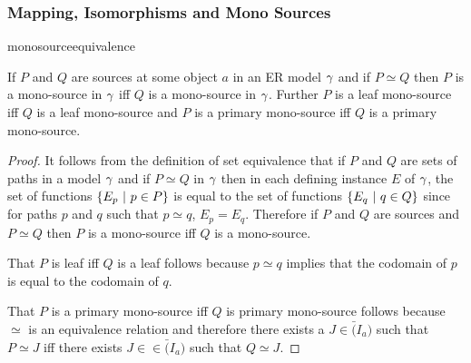 
\subsubsection{Mapping, Isomorphisms and Mono Sources}

monosourceequivalence
\begin{lemma}
\label{monosourceequivalence}
If  $P$ and $Q$ are sources at some object $a$ in an ER model $\gamma$ and if $P \simeq Q$  then   $P$ is a mono-source in $\gamma$ iff $Q$ is a mono-source in $\gamma$.  Further $P$ is a leaf mono-source iff $Q$ is a leaf mono-source and $P$ is a primary mono-source iff $Q$ is a primary mono-source.
\end{lemma}
\begin{proof}
It follows from the definition of set equivalence that if $P$ and $Q$ are sets of paths in a model $\gamma$ and if $P \simeq Q$ in $\gamma$ then in each defining instance $E$ of $\gamma$, the set of functions $\left\{E_p \ \middle|\ p \in P\right\}$ is equal to the set of functions $\left\{E_q \ \middle|\ q \in Q\right\}$ since for
paths $p$ and $q$ such that $p \simeq q$, $E_p=E_q$. Therefore if $P$ and $Q$ are sources and $P \simeq Q$ then $P$ is a mono-source iff $Q$ is a mono-source.


That $P$ is leaf  iff $Q$ is a leaf 
follows because $p \simeq q$ implies that the codomain of $p$ is equal to the codomain of $q$.

That $P$ is a primary mono-source iff $Q$ is  primary mono-source follows because  $\simeq$ is an equivalence relation and therefore there exists a $J \in \bar(I_a)$ such that $P \simeq J$ iff there exists 
$J \in \in \bar(I_a)$ such that $Q \simeq J$. 
\end{proof}


